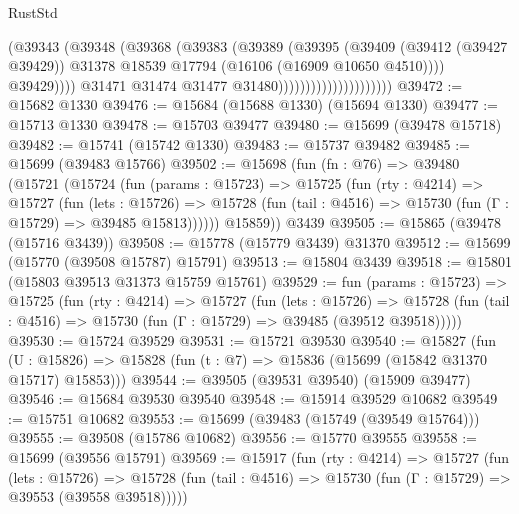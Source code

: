 \begin{lexlean}{RustStd}
\begin{coremodule}
                                            (@39343
                                              (@39348
                                                (@39368
                                                  (@39383
                                                    (@39389
                                                      (@39395
                                                        (@39409
                                                          (@39412 (@39427 @39429))
                                                          @31378
                                                          @18539
                                                          @17794
                                                          (@16106 (@16909 @10650 @4510))))
                                                      @39429))))
                                              @31471
                                              @31474
                                              @31477
                                              @31480)))))))))))))))))))))
@39472 := @15682 @1330
@39476 := @15684 (@15688 @1330) (@15694 @1330)
@39477 := @15713 @1330
@39478 := @15703 @39477
@39480 := @15699 (@39478 @15718)
@39482 := @15741 (@15742 @1330)
@39483 := @15737 @39482
@39485 := @15699 (@39483 @15766)
@39502 := @15698
    (fun (fn : @76) =>
    @39480
      (@15721
        (@15724
          (fun (params : @15723) =>
          @15725
            (fun (rty : @4214) =>
            @15727
              (fun (lets : @15726) =>
              @15728 (fun (tail : @4516) => @15730 (fun (Γ : @15729) => @39485 @15813))))))
        @15859))
    @3439
@39505 := @15865 (@39478 (@15716 @3439))
@39508 := @15778 (@15779 @3439) @31370
@39512 := @15699 (@15770 (@39508 @15787) @15791)
@39513 := @15804 @3439
@39518 := @15801 (@15803 @39513 @31373 @15759 @15761)
@39529 := fun (params : @15723) =>
  @15725
    (fun (rty : @4214) =>
    @15727
      (fun (lets : @15726) =>
      @15728 (fun (tail : @4516) => @15730 (fun (Γ : @15729) => @39485 (@39512 @39518)))))
@39530 := @15724 @39529
@39531 := @15721 @39530
@39540 := @15827
    (fun (U : @15826) => @15828 (fun (t : @7) => @15836 (@15699 (@15842 @31370 @15717) @15853)))
@39544 := @39505 (@39531 @39540) (@15909 @39477)
@39546 := @15684 @39530 @39540
@39548 := @15914 @39529 @10682
@39549 := @15751 @10682
@39553 := @15699 (@39483 (@15749 (@39549 @15764)))
@39555 := @39508 (@15786 @10682)
@39556 := @15770 @39555
@39558 := @15699 (@39556 @15791)
@39569 := @15917
    (fun (rty : @4214) =>
    @15727
      (fun (lets : @15726) =>
      @15728 (fun (tail : @4516) => @15730 (fun (Γ : @15729) => @39553 (@39558 @39518)))))

\end{coremodule}
\end{lexlean}
